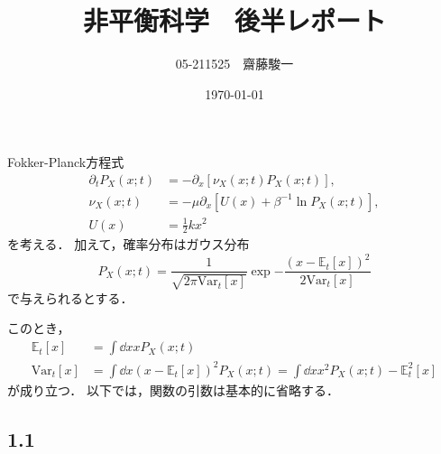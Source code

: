 \documentclass[a4paper,11pt]{jsarticle}
\begin{document}
\title{非平衡科学　後半レポート}
\author{05-211525　齋藤駿一}
\date{\today}
\maketitle

\section{}

Fokker-Planck方程式
\begin{align}
  \partial_t P_X(x;t) &= - \partial_x \left[ \nu_X(x;t) P_X(x;t) \right], \\
  \nu_X(x;t) &= - \mu \partial_x\left[U(x) + \beta^{-1} \ln{P_X(x;t)}\right], \\
  U(x) &= \frac{1}{2}kx^2
\end{align}
を考える．
加えて，確率分布はガウス分布
\begin{equation}
  P_X(x;t) = \frac{1}{\sqrt{2\pi \mathrm{Var}_t[x]}} \exp{-\frac{(x-\mathbb{E}_t[x])^2}{2\mathrm{Var}_t[x]}} \label{gaussian}
\end{equation}
で与えられるとする．

このとき，
\begin{align}
  \mathbb{E}_t[x] &= \int \dd{x} x P_X(x;t) \label{E}\\
  \mathrm{Var}_t[x] &= \int \dd{x} \left(x-\mathbb{E}_t[x]\right)^2 P_X(x;t) = \int \dd{x} x^2 P_X(x;t) - \mathbb{E}^2_t[x] \label{Var}
\end{align}
が成り立つ．
以下では，関数の引数は基本的に省略する．

\subsection*{1.1}
\end{document}
